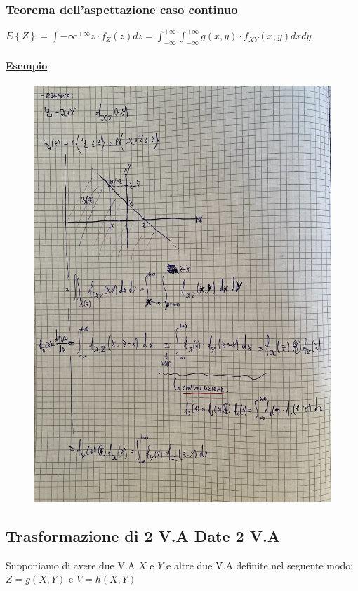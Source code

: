 \documentclass{article}
\begin{document}
\subsubsection{\underline{Teorema dell’aspettazione caso continuo}}
$E\left\{ Z \right\} = \int{-\infty}^{+\infty} z \cdot f_Z(z) dz = \int_{-\infty}^{+\infty} \int_{-\infty}^{+\infty} g(x,y) \cdot f_{XY}(x,y) dx dy$
\paragraph{\underline{Esempio}}
\begin{figure}[H]
\centering
\includegraphics[scale=0.16]{ese/47.jpeg}
\end{figure} 

\subsection{Trasformazione di 2 V.A Date 2 V.A}
Supponiamo di avere due V.A $X$ e $Y$ e altre due V.A definite nel seguente modo: $Z = g(X,Y)$ e $V = h(X,Y)$
\end{document}
